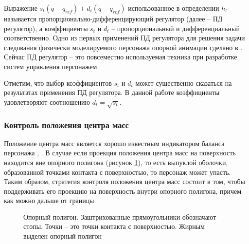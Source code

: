 Выражение $s_{t} (q - q_{ref}) + d_{t} (\dot{q} - \dot{q}_{ref})$ использованное в определении $h_{t}$ называется \break пропорционально-дифференцирующий регулятор (далее -- ПД регулятор), а коэффициенты $s_{t}$ и $d_{t}$ -- пропорциональный и дифференциальный соответственно. Одно из первых применений ПД регулятора для решения задачи следования физически моделируемого персонажа опорной анимации сделано в \cite{HodginsWBO}. Сейчас ПД регулятор -- это повсеместно используемая техника при разработке систем управления персонажем.

Отметим, что выбор коэффициентов $s_{t}$ и $d_{t}$ может существенно сказаться на результатах применения ПД регулятора. В данной работе коэффициенты удовлетворяют соотношению $d_{t} = \sqrt{s_{t}}$.

\subsubsection{Контроль положения центра масс}

Положение центра масс является хорошо известным индикатором баланса персонажа \cite{AbeSP}, \cite{MacchiettoZS}. В случае если проекция положения центра масс на поверхность находится вне опорного полигона (рисунок \ref{fig:support_polygon}), то есть выпуклой оболочки, образованной точками контакта с поверхностью, то персонаж может упасть. Таким образом, стратегия контроля положения центра масс состоит в том, чтобы поддерживать его проекцию на поверхность внутри опорного полигона, причем как можно дальше от границы.

\begin{figure}[ht]
  \begin{minipage}{\textwidth}
    \centering
    \caption{Опорный полигон. Заштрихованные прямоугольники обозначают стопы. Точки -- это точки контакта с поверхностью. Жирным выделен опорный полигон}
    \label{fig:support_polygon}
  \end{minipage}
\end{figure}

